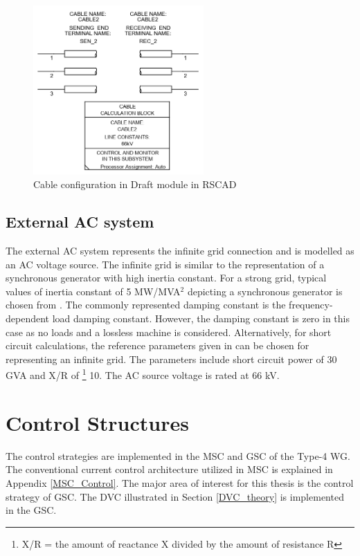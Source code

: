 \begin{figure}[H]
  \centering
  \includegraphics[height = 6.5cm,width = 6.5cm]{Diagrams/Chapter_3/CableParaBlock.PNG}  
  \caption{Cable configuration in Draft module in RSCAD}
  \label{fig:CableParaBlock}
\end{figure}

\subsection{External AC system}\label{ext_AC_source}
The external \gls{AC} system represents the infinite grid connection and is modelled as an \gls{AC} voltage source. The infinite grid is similar to the representation of a synchronous generator with high inertia constant. For a strong grid, typical values of inertia constant of 5 MW/MVA$^2$ depicting a synchronous generator is chosen from \cite{kothari2003modern}. The commonly represented damping constant is the frequency-dependent load damping constant. However, the damping constant is zero in this case as no loads and a lossless machine is considered. Alternatively, for short circuit calculations, the reference parameters given in \cite{wachal2014guide} can be chosen for representing an infinite grid. The parameters include short circuit power of 30 GVA and X/R of \footnote{X/R = the amount of reactance X divided by the amount of resistance R} 10. The \gls{AC} source voltage is rated at 66 kV.

\section{Control Structures}
The control strategies are implemented in the \gls{MSC} and \gls{GSC} of the Type-4 \gls{WG}. The conventional current control architecture utilized in \gls{MSC} is explained in Appendix \ref{MSC_Control}. The major area of interest for this thesis is the control strategy of \gls{GSC}. The \gls{DVC} illustrated in Section \ref{DVC_theory} is implemented in the \gls{GSC}.   

